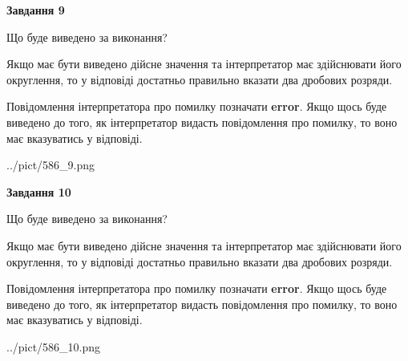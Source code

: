 \documentclass[12pt, ukrainian]{article}
\begin{document}
{\begin {Large}
{\begin {center}\textbf{Завдання 9}\end {center}}\par
Що буде виведено за виконання? \par

Якщо має бути виведено дійсне значення та інтерпретатор має здійснювати його округлення, 
то у відповіді достатньо правильно вказати два дробових розряди.

Повідомлення інтерпретатора про помилку позначати \textbf{error}.
Якщо щось буде виведено до того, як інтерпретатор видасть повідомлення про помилку, 
то воно має вказуватись у відповіді. \par

\begin{center}
	{../pict/586_9.png}
\end{center}
\newpage

{\begin {center}\textbf{Завдання 10}\end {center}}\par
Що буде виведено за виконання? \par

Якщо має бути виведено дійсне значення та інтерпретатор має здійснювати його округлення, 
то у відповіді достатньо правильно вказати два дробових розряди.

Повідомлення інтерпретатора про помилку позначати \textbf{error}.
Якщо щось буде виведено до того, як інтерпретатор видасть повідомлення про помилку, 
то воно має вказуватись у відповіді. \par

\begin{center}
	{../pict/586_10.png}
\end{center}
\newpage

\end {Large}}
\end{document}
